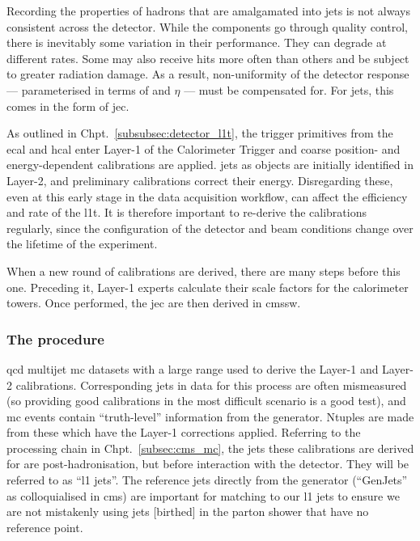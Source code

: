 Recording the properties of hadrons that are amalgamated into \glspl{jet} is not always consistent across the detector. While the components go through quality control, there is inevitably some variation in their performance. They can degrade at different rates. Some may also receive hits more often than others and be subject to greater radiation damage. As a result, non-uniformity of the detector response --- parameterised in terms of \pt and $\eta$ --- must be compensated for. For \glspl{jet}, this comes in the form of \gls{jec}.

As outlined in Chpt.~\ref{subsubsec:detector_l1t}, the trigger primitives from the \acrshort{ecal} and \acrshort{hcal} enter Layer-1 of the Calorimeter Trigger and coarse position- and energy-dependent calibrations are applied. \glspl{jet} as objects are initially identified in Layer-2, and preliminary calibrations correct their energy. Disregarding these, even at this early stage in the data acquisition workflow, can affect the efficiency and rate of the \acrlong{l1t}. It is therefore important to re-derive the calibrations regularly, since the configuration of the detector and beam conditions change over the lifetime of the experiment.

When a new round of calibrations are derived, there are many steps before this one. Preceding it, Layer-1 experts calculate their scale factors for the calorimeter towers. Once performed, the \acrlong{jec} are then derived in \acrshort{cmssw}.




\subsubsection{The procedure}
\label{subsubsec:detector_jec_procedure}

\acrshort{qcd} multijet \acrshort{mc} datasets with a large \pt range used to derive the Layer-1 and Layer-2 calibrations. Corresponding \glspl{jet} in data for this process are often mismeasured (so providing good calibrations in the most difficult scenario is a good test), and \acrshort{mc} events contain ``truth-level'' information from the generator. Ntuples are made from these which have the Layer-1 corrections applied. Referring to the processing chain in Chpt.~\ref{subsec:cms_mc}, the jets these calibrations are derived for are post-hadronisation, but before interaction with the detector. They will be referred to as ``\acrfull{l1} jets''. The reference jets directly from the generator (``GenJets'' as colloquialised in \acrshort{cms}) are important for matching to our \acrshort{l1} jets to ensure we are not mistakenly using jets [birthed] in the parton shower that have no reference point.

